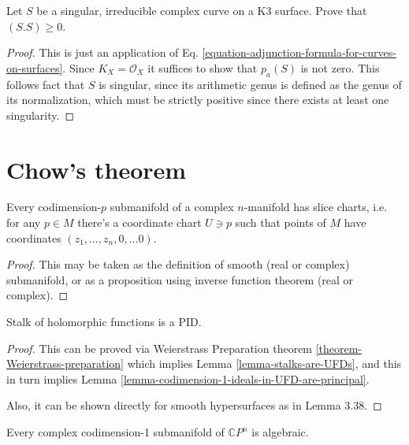 \begin{exercise}
\label{exercise-singular-curve-on-K3-has-positive-self-intersection}
Let $S$ be a singular, irreducible complex curve on a K3 surface. Prove that
$(S.S)\geq 0$.
\end{exercise}

\begin{proof}
This is just an application of Eq.
\ref{equation-adjunction-formula-for-curves-on-surfaces}. Since
$K_X=\mathcal{O}_X$ it suffices to show that $p_a(S)$ is not zero. This follows
fact that $S$ is singular, since its arithmetic genus is defined as the genus of
its normalization, which must be strictly positive since there exists at least
one singularity.
\end{proof}

\section{Chow's theorem}
\label{section-chow-theorem}

\begin{proposition}
\label{proposition-slice-charts}
Every codimension-$p$ submanifold of a complex $n$-manifold has slice charts,
i.e. for any $p \in M$ there's a coordinate chart $U \ni p$ such that points of
$M$ have coordinates $(z_1,\ldots,z_n,0,\ldots 0)$.
\end{proposition}

\begin{proof}
This may be taken as the definition of smooth (real or complex) submanifold, or
as a proposition using inverse function theorem (real or complex).
\end{proof}

\begin{proposition}
\label{proposition-stalk-is-PID}
Stalk of holomorphic functions is a PID.
\end{proposition}

\begin{proof}
This can be proved via Weierstrass Preparation theorem
\ref{theorem-Weierstrass-preparation} which implies
 Lemma \ref{lemma-stalks-are-UFDs}, and this in turn implies Lemma 
\ref{lemma-codimension-1-ideals-in-UFD-are-principal}.

Also, it can be shown directly for smooth hypersurfaces
 as in \cite{lec} Lemma 3.38.
\end{proof}

\begin{theorem}
\label{theorem-Chow-for-hypersurfaces}
Every complex codimension-1 submanifold of $\mathbb{C}P^{n}$ is algebraic.
\end{theorem}

